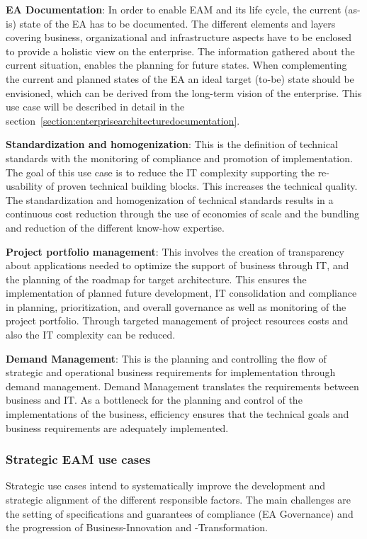 \textbf{EA Documentation}: In order to enable EAM and its life cycle, the current (as-is) state of the EA has to be documented. The different elements and layers covering business, organizational and infrastructure aspects have to be enclosed to provide a holistic view on the enterprise. The information gathered about the current situation, enables the planning for future states. When complementing the current and planned states of the EA an ideal target (to-be) state should be envisioned, which can be derived from the long-term vision of the enterprise. \cite{Buckl2009} This use case will be described in detail in the section~\ref{section:enterprisearchitecturedocumentation}.

\textbf{Standardization and homogenization}: This is the definition of technical standards with the monitoring of compliance and promotion of implementation. The goal of this use case is to reduce the IT complexity supporting the re-usability of proven technical building blocks. This increases the technical quality. The standardization and homogenization of technical standards results in a continuous cost reduction through the use of economies of scale and the bundling and reduction of the different know-how expertise. \cite{Hanschke2011}

\textbf{Project portfolio management}: This involves the creation of transparency about applications needed to optimize the support of business through IT, and the planning of the roadmap for target architecture. This ensures the implementation of planned future development, IT consolidation and compliance in planning, prioritization, and overall governance as well as monitoring of the project portfolio. Through targeted management of project resources costs and also the IT complexity can be reduced. \cite{Hanschke2011}

\textbf{Demand Management}: This is the planning and controlling the flow of strategic and operational business requirements for implementation through demand management. Demand Management translates the requirements between business and IT. As a bottleneck for the planning and control of the implementations of the business, efficiency ensures that the technical goals and business requirements are adequately implemented.

\subsubsection{Strategic EAM use cases}
Strategic use cases intend to systematically improve the development and strategic alignment of the different responsible factors. The main challenges are the setting of specifications and guarantees of compliance (EA Governance) and the progression of Business-Innovation and -Transformation.

